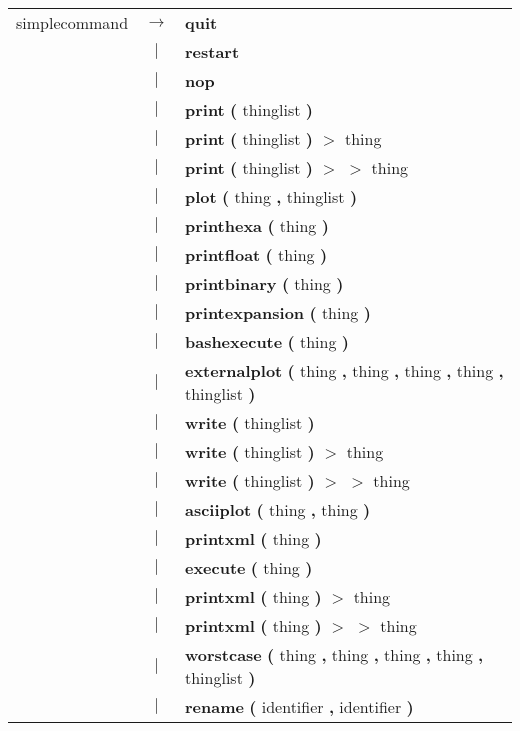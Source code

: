 \begin{tabular}{lcl} 
simplecommand & $\rightarrow$ & \textbf{quit} \\
 & $|$ & \textbf{restart} \\
 & $|$ & \textbf{nop} \\
 & $|$ & \textbf{print} \textbf{(} thinglist \textbf{)} \\
 & $|$ & \textbf{print} \textbf{(} thinglist \textbf{)} \textbf{$>$} thing \\
 & $|$ & \textbf{print} \textbf{(} thinglist \textbf{)} \textbf{$>$} \textbf{$>$} thing \\
 & $|$ & \textbf{plot} \textbf{(} thing \textbf{,} thinglist \textbf{)} \\
 & $|$ & \textbf{printhexa} \textbf{(} thing \textbf{)} \\
 & $|$ & \textbf{printfloat} \textbf{(} thing \textbf{)} \\
 & $|$ & \textbf{printbinary} \textbf{(} thing \textbf{)} \\
 & $|$ & \textbf{printexpansion} \textbf{(} thing \textbf{)} \\
 & $|$ & \textbf{bashexecute} \textbf{(} thing \textbf{)} \\
 & $|$ & \textbf{externalplot} \textbf{(} thing \textbf{,} thing \textbf{,} thing \textbf{,} thing \textbf{,} thinglist \textbf{)} \\
 & $|$ & \textbf{write} \textbf{(} thinglist \textbf{)} \\
 & $|$ & \textbf{write} \textbf{(} thinglist \textbf{)} \textbf{$>$} thing \\
 & $|$ & \textbf{write} \textbf{(} thinglist \textbf{)} \textbf{$>$} \textbf{$>$} thing \\
 & $|$ & \textbf{asciiplot} \textbf{(} thing \textbf{,} thing \textbf{)} \\
 & $|$ & \textbf{printxml} \textbf{(} thing \textbf{)} \\
 & $|$ & \textbf{execute} \textbf{(} thing \textbf{)} \\
 & $|$ & \textbf{printxml} \textbf{(} thing \textbf{)} \textbf{$>$} thing \\
 & $|$ & \textbf{printxml} \textbf{(} thing \textbf{)} \textbf{$>$} \textbf{$>$} thing \\
 & $|$ & \textbf{worstcase} \textbf{(} thing \textbf{,} thing \textbf{,} thing \textbf{,} thing \textbf{,} thinglist \textbf{)} \\
 & $|$ & \textbf{rename} \textbf{(} identifier \textbf{,} identifier \textbf{)} \\

\end{tabular}
